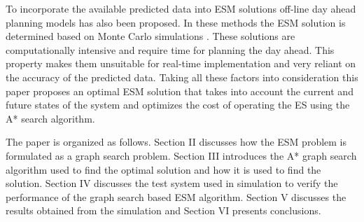 To incorporate the available predicted data into ESM solutions off-line day ahead planning models has also been proposed. In these methods the ESM solution is determined based on Monte Carlo simulations \cite{6872821,7010943,6839110}. These solutions are computationally intensive and require time for planning the day ahead. This property makes them unsuitable for real-time implementation and very reliant on the accuracy of the predicted data. Taking all these factors into consideration this paper proposes an optimal ESM solution that takes into account the current and future states of the system and optimizes the cost of operating the ES using the A* search algorithm.

The paper is organized as follows. Section II discusses how the ESM problem is formulated as a graph search problem. Section III introduces the A* graph search algorithm used to find the optimal solution and how it is used to find the solution. Section IV discusses the test system used in simulation to verify the performance of the graph search based ESM algorithm. Section V discusses the results obtained from the simulation and Section VI presents conclusions.